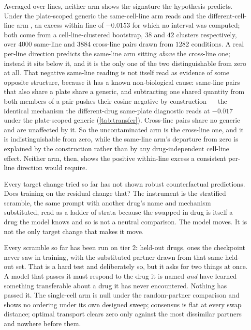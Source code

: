 Averaged over lines, neither arm shows the signature the hypothesis predicts.
Under the plate-scoped generic the same-cell-line arm reads
 and the different-cell-line arm
, an excess within line of $-0.0153$ for which no
interval was computed; both come from a cell-line-clustered bootstrap,
$\num{38}$ and $\num{42}$ clusters respectively, over $\num{4000}$ same-line and
$\num{3884}$ cross-line pairs drawn from $\num{1282}$ conditions. A real
per-line direction predicts the same-line arm sitting \emph{above} the
cross-line one; instead it sits below it, and it is the only one of the two
distinguishable from zero at all. That negative same-line reading is not itself
read as evidence of some opposite structure, because it has a known
non-biological cause: same-line pairs that also share a plate share a generic,
and subtracting one shared quantity from both members of a pair pushes their
cosine negative by construction --- the identical mechanism the different-drug same-plate diagnostic reads at $-0.017$ under the plate-scoped generic (\cref{tab:transfer}). Cross-line
pairs share no generic and are unaffected by it. So the uncontaminated arm is
the cross-line one, and it is indistinguishable from zero, while the same-line
arm's departure from zero is explained by the construction rather than by any
drug-independent cell-line effect. Neither arm, then, shows the positive
within-line excess a consistent per-line direction would require. 



\begin{question}[5]
Every target change tried so far has not shown robust counterfactual predictions. Does training on the residual change that? The instrument is the
stratified scramble, the same prompt with another drug's name and mechanism
substituted, read as a ladder of strata because the swapped-in drug is itself a
drug the model knows and so is not a neutral comparison. The model moves. It is
not the only target change that makes it move.
\end{question}

\noindent

Every scramble so far has been run on tier 2: held-out drugs, ones the
checkpoint never saw in training, with the substituted partner drawn from that
same held-out set. That is a hard test and deliberately so, but it asks for two
things at once. A model that passes it must respond to the drug it is named
\emph{and} have learned something transferable about a drug it has never
encountered. Nothing has passed it. The single-cell arm is null under the
random-partner comparison and shows no ordering under its own designed sweep;
consensus is flat at every swap distance; optimal transport clears zero only
against the most dissimilar partners and nowhere before them.

